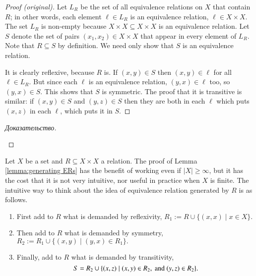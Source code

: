 \documentclass[a4paper]{book}
\def\tn{\textnormal}
\def\ss{\subseteq}
\def\|{{\;|\;}}
\theoremstyle{myth}
\newtheorem{remarkENG}[envENG]{\begin{english}Remark\end{english}}
\newenvironment{proofENG}{\begin{proof}[Proof (original)]}{\end{proof}}
\newtheorem{lemmaRUS}[envRUS]{\begin{russian}Лемма\end{russian}}
\newenvironment{proofRUS}{\begin{proof}[Доказательство]}{\end{proof}}
\begin{document}
\begin{english}
\begin{lemmaRUS}\label{lemma:generating ERs}
\begin{russian} \end{russian}
\end{lemmaRUS}

\begin{proofENG}
Let $L_R$ be the set of all equivalence relations on $X$ that contain $R$; in other words, each element $\ell\in L_R$ is an equivalence relation, $\ell\in X\times X$. The set $L_R$ is non-empty because $X\times X\ss X\times X$ is an equivalence relation. Let $S$ denote the set of pairs $(x_1,x_2)\in X\times X$ that appear in every element of $L_R$. Note that $R\ss S$ by definition. We need only show that $S$ is an equivalence relation.

It is clearly reflexive, because $R$ is. If $(x,y)\in S$ then $(x,y)\in\ell$ for all $\ell\in L_R$. But since each $\ell$ is an equivalence relation, $(y,x)\in\ell$ too, so $(y,x)\in S$. This shows that $S$ is symmetric. The proof that it is transitive is similar: if $(x,y)\in S$ and $(y,z)\in S$ then they are both in each $\ell$ which puts $(x,z)$ in each $\ell$, which puts it in $S$.
\end{proofENG}

\begin{proofRUS}
\begin{russian} \end{russian}
\end{proofRUS}

\begin{remarkENG}
Let $X$ be a set and $R\ss X\times X$ a relation. The proof of Lemma \ref{lemma:generating ERs} has the benefit of working even if $|X|\geq\infty$, but it has the cost that it is not very intuitive, nor useful in practice when $X$ is finite. The intuitive way to think about the idea of equivalence relation generated by $R$ is as follows.
\begin{enumerate}
\item First add to $R$ what is demanded by reflexivity, $R_1:=R\cup\{(x,x)\|x\in X\}$.
\item Then add to $R$ what is demanded by symmetry, $R_2:=R_1\cup\{(x,y)\|(y,x)\in R_1\}.$
\item Finally, add to $R$ what is demanded by transitivity, $$S=R_2\cup\{(x,z)\|(x,y)\in R_2, \tn{ and } (y,z)\in R_2\}.$$
\end{enumerate}
\end{remarkENG}


\end{english}
\end{document}
